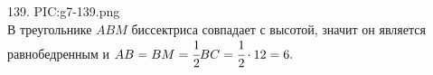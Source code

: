 139. {{PIC:g7-139.png}}\\
В треугольнике $ABM$ биссектриса совпадает с высотой, значит он является равнобедренным и $AB=BM=\cfrac{1}{2}BC=\cfrac{1}{2}\cdot12=6.$\\
